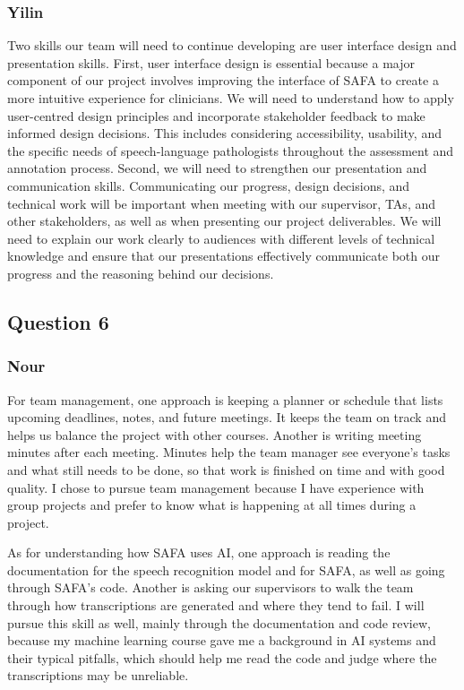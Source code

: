 \documentclass[12pt]{article}
\begin{document}
\subsubsection*{Yilin}
Two skills our team will need to continue developing are user interface design and presentation skills. First, user interface design is essential because a major component of our project involves improving the interface of SAFA to create a more intuitive experience for clinicians. We will need to understand how to apply user-centred design principles and incorporate stakeholder feedback to make informed design decisions. This includes considering accessibility, usability, and the specific needs of speech-language pathologists throughout the assessment and annotation process. Second, we will need to strengthen our presentation and communication skills. Communicating our progress, design decisions, and technical work will be important when meeting with our supervisor, TAs, and other stakeholders, as well as when presenting our project deliverables. We will need to explain our work clearly to audiences with different levels of technical knowledge and ensure that our presentations effectively communicate both our progress and the reasoning behind our decisions.

\subsection*{Question 6}
\subsubsection*{Nour}
For team management, one approach is keeping a planner or schedule that lists upcoming deadlines, notes, and future meetings. 
It keeps the team on track and helps us balance the project with other courses. 
Another is writing meeting minutes after each meeting. 
Minutes help the team manager see everyone’s tasks and what still needs to be done, so that work is finished on time and with good quality. 
I chose to pursue team management because I have experience with group projects and prefer to know what is happening at all times during a project.

As for understanding how SAFA uses AI, one approach is reading the documentation for the speech recognition model and for SAFA, as well as going through SAFA’s code. 
Another is asking our supervisors to walk the team through how transcriptions are generated and where they tend to fail. 
I will pursue this skill as well, mainly through the documentation and code review, because my machine learning course gave me a background in AI systems and their typical pitfalls, which should help me read the code and judge where the transcriptions may be unreliable.
\end{document}
